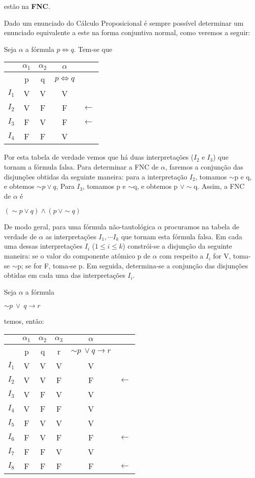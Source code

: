 estão na \textbf{FNC}.

Dado um enunciado do Cálculo Proposicional é sempre possível determinar um enunciado equivalente a este na forma conjuntiva normal, como veremos a seguir:

\begin{exemplo}
    Seja $\alpha$ a fórmula $p \iff q$.
    Tem-se que
\end{exemplo}

\begin{tabular}{c | c c c l}
    & $\alpha_1$ & $\alpha_2$ & $\alpha$ & \\ \hline
    & p & q & $p \iff q$ & \\
    $I_1$ & V & V & V & \\
    $I_2$ & V & F & F & $\longleftarrow$ \\
    $I_3$ & F & V & F & $\longleftarrow$ \\
    $I_4$ & F & F & V &
\end{tabular}

\bigskip
Por esta tabela de verdade vemos que há duas interpretações ($I_2$ e $I_3$) que tornam a fórmula falsa. Para determinar a FNC de $\alpha$, faremos a conjunção das disjunções obtidas da seguinte maneira: para a interpretação $I_2$, tomamos $\sim$p  e  q, e obtemos $\sim p \lor q$, Para $I_3$, tomamos p e $\sim$q, e obtemos p $\lor \sim$q.  Assim, a FNC de $\alpha$ é

\centerline{$(\sim p \lor q) \land (p\ \lor \sim q)$}

De modo geral, para uma fórmula não-tautológica $\alpha$ procuramos na tabela de verdade de $\alpha$ as interpretações $I_1, \cdots I_k$ que tornam esta fórmula falsa. Em cada uma dessas interpretações $I_i$ ($1 \leq i \leq k$) constrói-se a disjunção da seguinte maneira: se o valor do componente atômico p de $\alpha$ com respeito a $I_i$ for V, toma-se $\sim$p; se for F, toma-se p. Em seguida, determina-se a conjunção das disjunções obtidas em cada uma das interpretações $I_i$.

\begin{exemplo}
    Seja $\alpha$ a fórmula

    \centerline{$\sim p\ \lor\ q \to r$}
\end{exemplo}

temos, então:

\bigskip
\begin{tabular}{c | c c c c l}
    & $\alpha_1$ & $\alpha_2$ & $\alpha_3$ & $\alpha$ & \\ \hline
    & p & q & r & $\sim p\ \lor q \to r$& \\
    $I_1$ & V & V & V & V & \\
    $I_2$ & V & V & F & F & $\longleftarrow$ \\
    $I_3$ & V & F & V & V & \\
    $I_4$ & V & F & F & V & \\
    $I_5$ & F & V & V & V & \\
    $I_6$ & F & V & F & F & $\longleftarrow$ \\
    $I_7$ & F & F & V & V & \\
    $I_8$ & F & F & F & F & $\longleftarrow$
\end{tabular}
\bigskip

